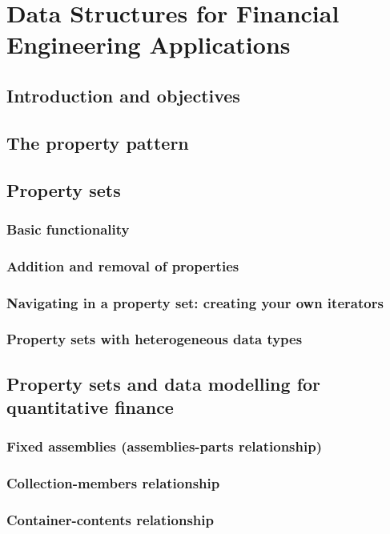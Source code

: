 \chapter{Data Structures for Financial Engineering Applications}

\section{Introduction and objectives}
\section{The property pattern}
\section{Property sets}

\subsection{Basic functionality}
\subsection{Addition and removal of properties}
\subsection{Navigating in a property set: creating your own iterators}
\subsection{Property sets with heterogeneous data types}

\section{Property sets and data modelling for quantitative finance}

\subsection{Fixed assemblies (assemblies-parts relationship)}
\subsection{Collection-members relationship}
\subsection{Container-contents relationship}
